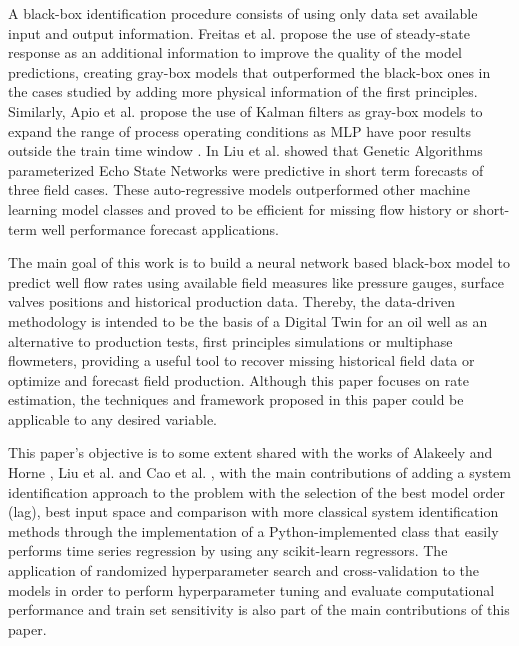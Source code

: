 \documentclass[conference]{IEEEtran}
\begin{document}
A black-box identification procedure consists of using only data set available input and output 
information. Freitas et al. \cite{Freitas2021} propose the use of steady-state response as an 
additional information to improve the quality of the model predictions, creating gray-box 
models that outperformed the black-box ones in the cases studied by adding more physical 
information of the first principles. Similarly, Apio et al. \cite{Apio2019} propose the use of 
Kalman filters as gray-box models to expand the range of process operating conditions as MLP 
have poor results outside the train time window \cite{Apio2019}. In \cite{Liu2022} Liu et al. 
showed that Genetic Algorithms parameterized Echo State Networks were predictive in short term 
forecasts of three field cases. These auto-regressive models outperformed other machine learning 
model classes and proved to be efficient for missing flow history or short-term well performance 
forecast applications.

The main goal of this work is to build a neural network based black-box model to predict well 
flow rates using available field measures like pressure gauges, surface valves positions and 
historical production data. Thereby, the data-driven methodology is intended to be the basis 
of a Digital Twin for an oil well as an alternative to production tests, first principles 
simulations or multiphase flowmeters, providing a useful tool to recover missing historical 
field data or optimize and forecast field production. Although this paper focuses on rate 
estimation, the techniques and framework proposed in this paper could be applicable to any 
desired variable.

This paper's objective is to some extent shared with the works of Alakeely and Horne 
\cite{Alakeely2021}, Liu et al. \cite{Liu2022} and Cao et al. \cite{CaoQ2016}, with the main 
contributions of adding a system identification approach to the problem with the selection of 
the best model order (lag), best input space and comparison with more classical system 
identification methods through the implementation of a Python-implemented class that easily 
performs time series regression by using any scikit-learn regressors. The application of 
randomized hyperparameter search and cross-validation to the models in order to perform 
hyperparameter tuning and evaluate computational performance and train set sensitivity is 
also part of the main contributions of this paper.
\end{document}
